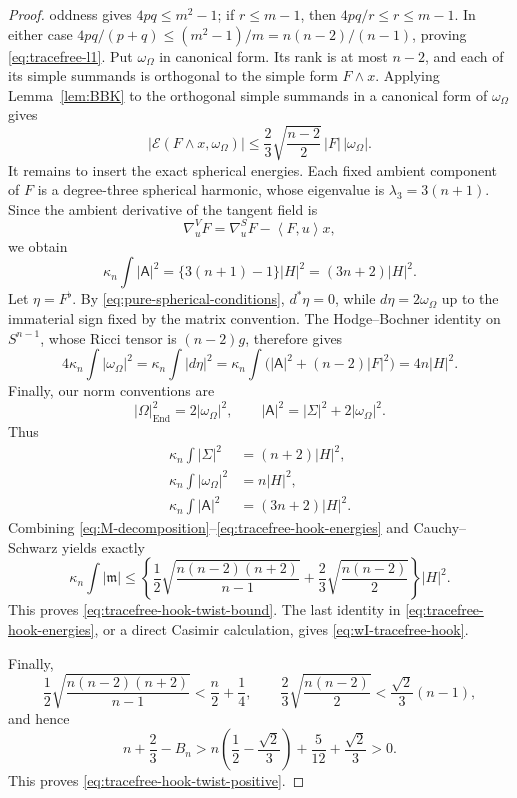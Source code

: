 \documentclass[reqno,11pt]{amsart}
\theoremstyle{definition}
\newcommand{\cE}{\mathcal E}
\newcommand{\End}{\operatorname{End}}
\newcommand{\inner}[2]{\left\langle #1,#2\right\rangle}
\begin{document}
\begin{proof}
oddness gives $4pq\leq m^2-1$; if $r\leq m-1$, then
$4pq/r\leq r\leq m-1$.  In either case
$4pq/(p+q)\leq(m^2-1)/m=n(n-2)/(n-1)$, proving
\eqref{eq:tracefree-l1}.
Put $\omega_\Omega$ in canonical form.  Its rank is at most $n-2$, and
each of its simple summands is orthogonal to the simple form $F\wedge x$.
Applying Lemma~\ref{lem:BBK} to the orthogonal simple summands in a
canonical form of $\omega_\Omega$ gives
\begin{equation*}
 |\cE(F\wedge x,\omega_\Omega)|
 \leq\frac23\sqrt{\frac{n-2}{2}}\,|F|\,|\omega_\Omega|.
\end{equation*}
It remains to insert the exact spherical energies.  Each fixed ambient
component of $F$ is a degree-three spherical harmonic, whose eigenvalue is
$\lambda_3=3(n+1)$.  Since the ambient derivative of the tangent field is
$$
 \nabla^V_uF=\nabla^S_uF-\inner{F}{u}x,
$$
we obtain
$$
 \kappa_n\int|\mathsf A|^2
 =\{3(n+1)-1\}|H|^2=(3n+2)|H|^2.
$$
Let $\eta=F^\flat$. By \eqref{eq:pure-spherical-conditions},
$d^*\eta=0$, while $d\eta=2\omega_\Omega$ up to the immaterial sign fixed
by the matrix convention.  The Hodge--Bochner identity on $S^{n-1}$,
whose Ricci tensor is $(n-2)g$, therefore gives
$$
 4\kappa_n\int|\omega_\Omega|^2
 =\kappa_n\int|d\eta|^2
 =\kappa_n\int\bigl(|\mathsf A|^2+(n-2)|F|^2\bigr)
 =4n|H|^2.
$$
Finally, our norm conventions are
$$
 |\Omega|_{\End}^2=2|\omega_\Omega|^2,
 \qquad |\mathsf A|^2=|\Sigma|^2+2|\omega_\Omega|^2.
$$
Thus
\begin{equation}\label{eq:tracefree-hook-energies}
\begin{split}
 \kappa_n\int|\Sigma|^2&=(n+2)|H|^2,\\
 \kappa_n\int|\omega_\Omega|^2&=n|H|^2,\\
 \kappa_n\int|\mathsf A|^2&=(3n+2)|H|^2.
\end{split}
\end{equation}
Combining \eqref{eq:M-decomposition}--\eqref{eq:tracefree-hook-energies} and
Cauchy--Schwarz yields exactly
$$
 \kappa_n\int|\mathfrak m|
 \leq\left\{
 \frac12\sqrt{\frac{n(n-2)(n+2)}{n-1}}
 +\frac23\sqrt{\frac{n(n-2)}2}\right\}|H|^2.
$$
This proves \eqref{eq:tracefree-hook-twist-bound}.  The last identity in
\eqref{eq:tracefree-hook-energies}, or a direct Casimir calculation, gives
\eqref{eq:wI-tracefree-hook}.

Finally,
$$
 \frac12\sqrt{\frac{n(n-2)(n+2)}{n-1}}<\frac n2+\frac14,
 \qquad
 \frac23\sqrt{\frac{n(n-2)}2}<\frac{\sqrt2}{3}(n-1),
$$
and hence
$$
 n+\frac23-B_n
 >n\left(\frac12-\frac{\sqrt2}{3}\right)
   +\frac5{12}+\frac{\sqrt2}{3}>0.
$$
This proves \eqref{eq:tracefree-hook-twist-positive}.
\end{proof}
\end{document}
